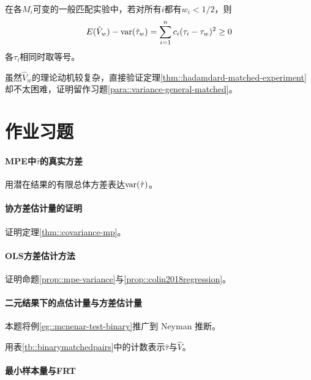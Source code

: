 \begin{theorem}
\label{thm::hadamdard-matched-experiment}
在各$M_i$可变的一般匹配实验中，若对所有$i$都有$w_i < 1/2$，则
$$
 E(\hat{V}_w ) - \textup{var}( \hat\tau_w  ) = \sum_{i=1}^n c_i (\tau_i - \tau_w )^2 \geq 0
 $$
各$\tau_i $相同时取等号。 
\end{theorem}

虽然$\hat{V}_w $的理论动机较复杂，直接验证定理\ref{thm::hadamdard-matched-experiment}却不太困难，证明留作习题\ref{para::variance-general-matched}。 
 



\section{作业习题}

\paragraph{MPE中$\hat{\tau}$的真实方差}
\label{para::variance-mp-design}

用潜在结果的有限总体方差表达$\textup{var}(\hat{\tau})$。 

\paragraph{协方差估计量的证明}\label{para::covariance-est-proof}
证明定理\ref{thm::covariance-mp}。

\paragraph{OLS方差估计方法}\label{para::seols-matchedpairs}
证明命题\ref{prop::mpe-variance}与\ref{prop::colin2018regression}。 


\paragraph{二元结果下的点估计量与方差估计量}\label{para::binary-matchedpairs-neyman}


本题将例\ref{eg::mcnenar-test-binary}推广到 Neyman 推断。 

用表\ref{tb::binarymatchedpairs}中的计数表示$\hat\tau$与$\hat V$。 




\paragraph{最小样本量与FRT}
\label{prob::minimum-n-0.001}

